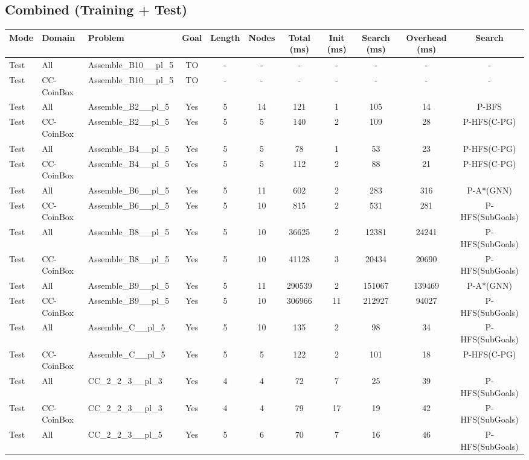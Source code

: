 \documentclass{article}
\begin{document}
\subsection*{Combined (Training + Test)}
\begin{tabular}{lllcccccccc}
\toprule
Mode & Domain & Problem & Goal & Length & Nodes & Total (ms) & Init (ms) & Search (ms) & Overhead (ms) & Search \\
\midrule
Test & All & Assemble\_B10\_\_pl\_5 & TO & - & - & - & - & - & - & - \\
Test & CC-CoinBox & Assemble\_B10\_\_pl\_5 & TO & - & - & - & - & - & - & - \\
Test & All & Assemble\_B2\_\_pl\_5 & Yes & 5 & 14 & 121 & 1 & 105 & 14 & P-BFS \\
Test & CC-CoinBox & Assemble\_B2\_\_pl\_5 & Yes & 5 & 5 & 140 & 2 & 109 & 28 & P-HFS(C-PG) \\
Test & All & Assemble\_B4\_\_pl\_5 & Yes & 5 & 5 & 78 & 1 & 53 & 23 & P-HFS(C-PG) \\
Test & CC-CoinBox & Assemble\_B4\_\_pl\_5 & Yes & 5 & 5 & 112 & 2 & 88 & 21 & P-HFS(C-PG) \\
Test & All & Assemble\_B6\_\_pl\_5 & Yes & 5 & 11 & 602 & 2 & 283 & 316 & P-A*(GNN) \\
Test & CC-CoinBox & Assemble\_B6\_\_pl\_5 & Yes & 5 & 10 & 815 & 2 & 531 & 281 & P-HFS(SubGoals) \\
Test & All & Assemble\_B8\_\_pl\_5 & Yes & 5 & 10 & 36625 & 2 & 12381 & 24241 & P-HFS(SubGoals) \\
Test & CC-CoinBox & Assemble\_B8\_\_pl\_5 & Yes & 5 & 10 & 41128 & 3 & 20434 & 20690 & P-HFS(SubGoals) \\
Test & All & Assemble\_B9\_\_pl\_5 & Yes & 5 & 11 & 290539 & 2 & 151067 & 139469 & P-A*(GNN) \\
Test & CC-CoinBox & Assemble\_B9\_\_pl\_5 & Yes & 5 & 10 & 306966 & 11 & 212927 & 94027 & P-HFS(SubGoals) \\
Test & All & Assemble\_C\_\_pl\_5 & Yes & 5 & 10 & 135 & 2 & 98 & 34 & P-HFS(SubGoals) \\
Test & CC-CoinBox & Assemble\_C\_\_pl\_5 & Yes & 5 & 5 & 122 & 2 & 101 & 18 & P-HFS(C-PG) \\
Test & All & CC\_2\_2\_3\_\_pl\_3 & Yes & 4 & 4 & 72 & 7 & 25 & 39 & P-HFS(SubGoals) \\
Test & CC-CoinBox & CC\_2\_2\_3\_\_pl\_3 & Yes & 4 & 4 & 79 & 17 & 19 & 42 & P-HFS(SubGoals) \\
Test & All & CC\_2\_2\_3\_\_pl\_5 & Yes & 5 & 6 & 70 & 7 & 16 & 46 & P-HFS(SubGoals) \\

\end{tabular}
\end{document}
